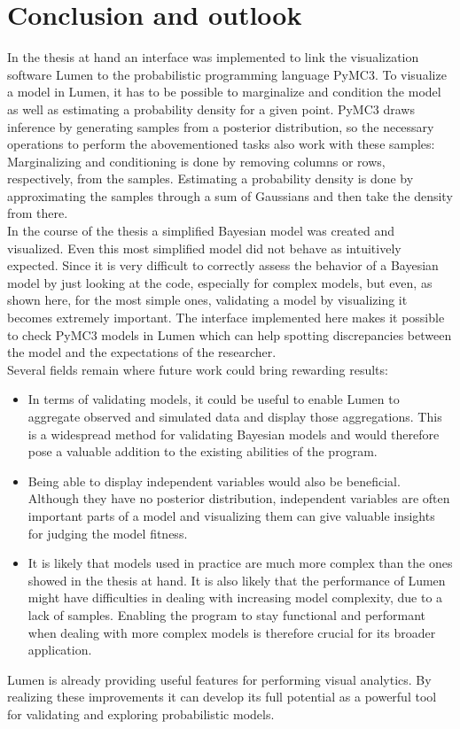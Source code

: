 \documentclass{article}
\begin{document}
\section {Conclusion and outlook}
In the thesis at hand an interface was implemented to link the visualization software Lumen to the probabilistic programming language PyMC3. To visualize a model in Lumen, it has to be possible to marginalize and condition the model as well as estimating a probability density for a given point. PyMC3 draws inference by generating samples from a posterior distribution, so the necessary operations to perform the abovementioned tasks also work with these samples: Marginalizing and conditioning is done by removing columns or rows, respectively, from the samples. Estimating a probability density is done by approximating the samples through a sum of Gaussians and then take the density from there.\\
In the course of the thesis a simplified Bayesian model was created and visualized. Even this most simplified model did not behave as intuitively expected. Since it is very difficult to correctly assess the behavior of a Bayesian model by just looking at the code, especially for complex models, but even, as shown here, for the most simple ones, validating a model by visualizing it becomes extremely important. The interface implemented here makes it possible to check PyMC3 models in Lumen which can help spotting discrepancies between the model and the expectations of the researcher.\\
Several fields remain where future work could bring rewarding results:
\begin{itemize}
	\item In terms of validating models, it could be useful to enable Lumen to aggregate observed and simulated data and display those aggregations. This is a widespread method for validating Bayesian models and would therefore pose a valuable addition to the existing abilities of the program.
	\item Being able to display independent variables would also be beneficial. Although they have no posterior distribution, independent variables are often important parts of a model and visualizing them can give valuable insights for judging the model fitness.
	\item It is likely that models used in practice are much more complex than the ones showed in the thesis at hand. It is also likely that the performance of Lumen might have difficulties in dealing with increasing model complexity, due to a lack of samples. Enabling the program to stay functional and performant when dealing with more complex models is therefore crucial for its broader application.
\end{itemize}
Lumen is already providing useful features for performing visual analytics. By realizing these improvements it can develop its full potential as a powerful tool for validating and exploring probabilistic models.
\end{document}
